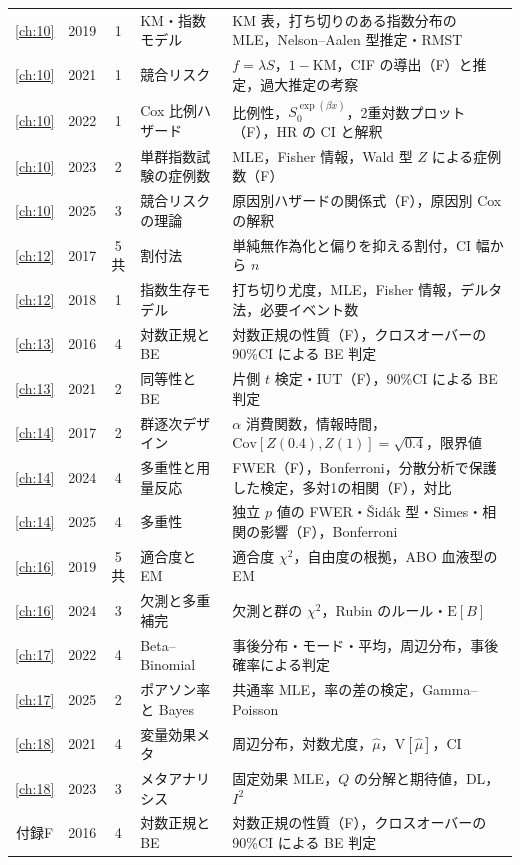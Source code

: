 \documentclass[a4paper,11pt,openany]{ltjsbook}
\newcommand{\E}{\mathrm{E}}
\newcommand{\V}{\mathrm{V}}
\newcommand{\Cov}{\mathrm{Cov}}
\begin{document}
\begin{center}
\begin{longtable}{@{}cccL{36mm}L{78mm}@{}}
\ref{ch:10} & 2019 & 1 & KM・指数モデル & KM 表，打ち切りのある指数分布の MLE，Nelson--Aalen 型推定・RMST\\
\ref{ch:10} & 2021 & 1 & 競合リスク & $f=\lambda S$，$1-$KM，CIF の導出（F）と推定，過大推定の考察\\
\ref{ch:10} & 2022 & 1 & Cox 比例ハザード & 比例性，$S_0^{\exp(\beta x)}$，2重対数プロット（F），HR の CI と解釈\\
\ref{ch:10} & 2023 & 2 & 単群指数試験の症例数 & MLE，Fisher 情報，Wald 型 $Z$ による症例数（F）\\
\ref{ch:10} & 2025 & 3 & 競合リスクの理論 & 原因別ハザードの関係式（F），原因別 Cox の解釈\\
\midrule
\ref{ch:12} & 2017 & 5共 & 割付法 & 単純無作為化と偏りを抑える割付，CI 幅から $n$\\
\ref{ch:12} & 2018 & 1 & 指数生存モデル & 打ち切り尤度，MLE，Fisher 情報，デルタ法，必要イベント数\\
\midrule
\ref{ch:13} & 2016 & 4 & 対数正規と BE & 対数正規の性質（F），クロスオーバーの90\%CI による BE 判定\\
\ref{ch:13} & 2021 & 2 & 同等性と BE & 片側 $t$ 検定・IUT（F），90\%CI による BE 判定\\
\midrule
\ref{ch:14} & 2017 & 2 & 群逐次デザイン & $\alpha$ 消費関数，情報時間，$\Cov[Z(0.4),Z(1)]=\sqrt{0.4}$，限界値\\
\ref{ch:14} & 2024 & 4 & 多重性と用量反応 & FWER（F），Bonferroni，分散分析で保護した検定，多対1の相関（F），対比\\
\ref{ch:14} & 2025 & 4 & 多重性 & 独立 $p$ 値の FWER・Šidák 型・Simes・相関の影響（F），Bonferroni\\
\midrule
\ref{ch:16} & 2019 & 5共 & 適合度と EM & 適合度 $\chi^2$，自由度の根拠，ABO 血液型の EM\\
\ref{ch:16} & 2024 & 3 & 欠測と多重補完 & 欠測と群の $\chi^2$，Rubin のルール・$\E[B]$\\
\midrule
\ref{ch:17} & 2022 & 4 & Beta--Binomial & 事後分布・モード・平均，周辺分布，事後確率による判定\\
\ref{ch:17} & 2025 & 2 & ポアソン率と Bayes & 共通率 MLE，率の差の検定，Gamma--Poisson\\
\midrule
\ref{ch:18} & 2021 & 4 & 変量効果メタ & 周辺分布，対数尤度，$\hat\mu$，$\V[\hat\mu]$，CI\\
\ref{ch:18} & 2023 & 3 & メタアナリシス & 固定効果 MLE，$Q$ の分解と期待値，DL，$I^2$\\
\midrule
付録F & 2016 & 4 & 対数正規と BE & 対数正規の性質（F），クロスオーバーの90\%CI による BE 判定\\

\end{longtable}
\end{center}
\end{document}
